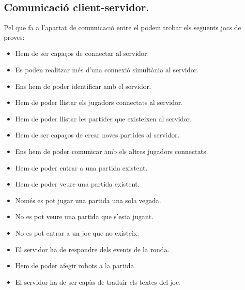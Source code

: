 \subsection{Comunicació client-servidor.}

Pel que fa a l'apartat de comunicació entre el  podem trobar els següents jocs de proves:

\begin{itemize}   
    \item{Hem de ser capaços de connectar al servidor.}
    \item{Es poden realitzar més d'una connexió simultània al servidor.}
    \item{Ens hem de poder identificar amb el servidor.}
    \item{Hem de poder llistar els jugadors connectats al servidor.}
    \item{Hem de poder llistar les partides que existeixen al servidor.} 
    \item{Hem de ser capaços de crear noves partides al servidor.}
    \item{Ens hem de poder comunicar amb els altres jugadors connectats.}
    \item{Hem de poder entrar a una partida existent.}
    \item{Hem de poder veure una partida existent.}
    \item{Només es pot jugar una partida una sola vegada.}
    \item{No es pot veure una partida que s'esta jugant.}
    \item{No es pot entrar a un joc que no existeix.}
    \item{El servidor ha de respondre dels events de la ronda.}
    \item{Hem de poder afegir robots a la partida.}
    \item{El servidor ha de ser capàs de traduir els textes del joc.}
\end{itemize}

